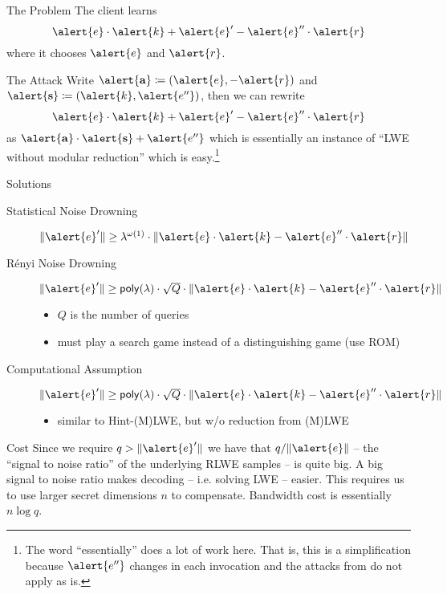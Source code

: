 \documentclass[xcolor=table,10pt,aspectratio=169]{beamer}
\renewcommand{\vec}[1]{\ensuremath{\mathbf{#1}}\xspace}
\begin{document}
\begin{frame}[label={sec:org1cb472a}]{The Problem}
The client learns
\[\alert{e}\cdot\alert{k} + \alert{e}'  - \alert{e}'' \cdot \alert{r}\]
where it chooses \(\alert{e}\) and \(\alert{r}\). 
\begin{block}{The Attack}
Write \(\alert{\vec{a}} \coloneqq (\alert{e}, -\alert{r})\) and \(\alert{\vec{s}} \coloneqq (\alert{k}, \alert{e''})\), then we can rewrite \[\alert{e}\cdot\alert{k} + \alert{e}'  - \alert{e}'' \cdot \alert{r}\]
as \(\alert{\vec{a}} \cdot \alert{\vec{s}} + \alert{e''}\) which is essentially an instance of ``LWE without modular reduction'' \cite{AC:BDEFT18} which is easy.\footnote{The word ``essentially'' does a lot of work here. That is, this is a simplification because \(\alert{e''}\) changes in each invocation and the attacks from \cite{AC:BDEFT18} do not apply as is.}
\end{block}
\end{frame}
\begin{frame}[label={sec:orgf83cf19}]{Solutions}
\begin{description}
\item[{Statistical Noise Drowning}] \(\Vert\alert{e}'\Vert \geq \lambda^{\omega(1)} \cdot \Vert\alert{e}\cdot\alert{k}  - \alert{e}'' \cdot \alert{r}\Vert\) \cite{PKC:ADDS21}
\item[{Rényi Noise Drowning}] \(\Vert\alert{e}'\Vert \geq \poly \cdot \sqrt{Q} \cdot \Vert\alert{e}\cdot\alert{k}  - \alert{e}'' \cdot \alert{r}\Vert\) \cite{AC:AlbGur24}
\begin{itemize}
\item \(Q\) is the number of queries
\item must play a search game instead of a distinguishing game (use ROM)
\end{itemize}
\item[{Computational Assumption}] \(\Vert\alert{e}'\Vert \geq \poly \cdot \sqrt{Q} \cdot \Vert\alert{e}\cdot\alert{k}  - \alert{e}'' \cdot \alert{r}\Vert\) \cite{EPRINT:ESTX24}
\begin{itemize}
\item similar to Hint-(M)LWE, but w/o reduction from (M)LWE
\end{itemize}
\end{description}
\begin{block}{Cost}
Since we require \(q > \Vert\alert{e}'\Vert\) we have that \(q/\Vert \alert{e} \Vert\) -- the ``signal to noise ratio'' of the underlying RLWE samples -- is quite big.  A big signal to noise ratio makes decoding -- i.e. solving LWE -- easier. This requires us to use larger secret dimensions \(n\) to compensate. Bandwidth cost is essentially \(n \log q\).
\end{block}
\end{frame}
\end{document}
